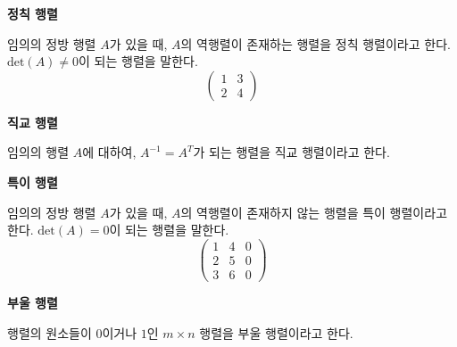 \bigskip
\begin{flushleft}
    {\textcolor{subheader}{{\LARGE\textbf{정칙 행렬}}}}
\end{flushleft}

\begin{tcolorbox}[colback = white, colframe = Definition, title = \textmd{정의: 정칙 행렬}]
    임의의 정방 행렬 $A$가 있을 때, $A$의 역행렬이 존재하는 행렬을 정칙 행렬이라고 한다. $\text{det} (A) \neq 0$이 되는 행렬을 말한다.    
    \[ \begin{pmatrix} 1 & 3 \\ 2 & 4 \end{pmatrix} \]
\end{tcolorbox}

\bigskip
\begin{flushleft}
    {\textcolor{subheader}{{\LARGE\textbf{직교 행렬}}}}
\end{flushleft}

\begin{tcolorbox}[colback = white, colframe = Definition, title = \textmd{정의: 직교 행렬}]
    임의의 행렬 $A$에 대하여, $A^{-1} = A^{T}$가 되는 행렬을 직교 행렬이라고 한다.
\end{tcolorbox}

\bigskip
\begin{flushleft}
    {\textcolor{subheader}{{\LARGE\textbf{특이 행렬}}}}
\end{flushleft}

\begin{tcolorbox}[colback = white, colframe = Definition, title = \textmd{정의: 특이 행렬}]
    임의의 정방 행렬 $A$가 있을 때, $A$의 역행렬이 존재하지 않는 행렬을 특이 행렬이라고 한다. $\text{det} (A) = 0$이 되는 행렬을 말한다.
    \[ \begin{pmatrix} 1 & 4 & 0 \\ 2 & 5 & 0 \\ 3 & 6 & 0 \end{pmatrix} \]
\end{tcolorbox}

\newpage
\begin{flushleft}
    {\textcolor{subheader}{{\LARGE\textbf{부울 행렬}}}}
\end{flushleft}

\begin{tcolorbox}[colback = white, colframe = Definition, title = \textmd{정의: 부울 행렬}]
    행렬의 원소들이 $0$이거나 $1$인 $m \times n$ 행렬을 부울 행렬이라고 한다.
\end{tcolorbox}

